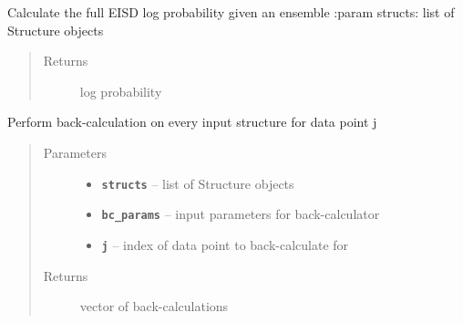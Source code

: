 \documentclass[letterpaper,10pt,english]{sphinxmanual}
\begin{document}
\begin{fulllineitems}
\begin{fulllineitems}
\begin{quote}
\begin{description}
\end{description}\end{quote}

\end{fulllineitems}


\begin{fulllineitems}
\label{modules:eisd.DataEISD.calc_logp}
Calculate the full EISD log probability given an ensemble
:param structs: list of Structure objects
\begin{quote}\begin{description}
\item[{Returns}] \leavevmode
log probability

\end{description}\end{quote}

\end{fulllineitems}


\begin{fulllineitems}
\label{modules:eisd.DataEISD.compute_all_back_calc}
Perform back-calculation on every input structure for data point j
\begin{quote}\begin{description}
\item[{Parameters}] \leavevmode\begin{itemize}
\item {} 
\textbf{\texttt{structs}} -- list of Structure objects

\item {} 
\textbf{\texttt{bc\_params}} -- input parameters for back-calculator

\item {} 
\textbf{\texttt{j}} -- index of data point to back-calculate for

\end{itemize}

\item[{Returns}] \leavevmode
vector of back-calculations

\end{description}\end{quote}

\end{fulllineitems}


\end{fulllineitems}
\end{document}
